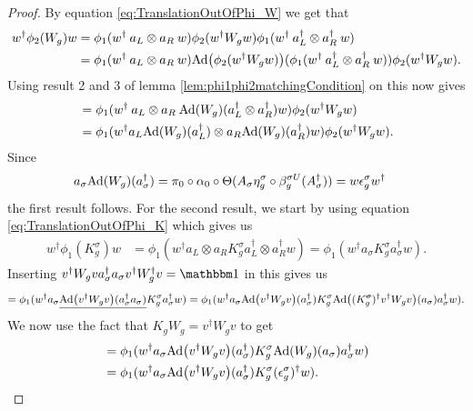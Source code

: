 \documentclass[11pt,a4paper,twoside]{article}
\numberwithin{equation}{section}
\begin{document}
	\begin{proof}
		By equation \eqref{eq:TranslationOutOfPhi_W} we get that
		\begin{align}
			w^\dagger\phi_2(W_g)w&=\phi_1(w^\dagger \: a_L\otimes a_R \: w)\phi_2(w^\dagger W_g w)\phi_1(w^\dagger \: a_L^\dagger\otimes a_R^\dagger \: w)\\
			&=\phi_1(w^\dagger \: a_L\otimes a_R \: w)\Ad{\phi_2(w^\dagger W_g w)}(\phi_1(w^\dagger \: a_L^\dagger\otimes a_R^\dagger \: w))\phi_2(w^\dagger W_g w).
		\end{align}
		Using result 2 and 3 of lemma \ref{lem:phi1phi2matchingCondition} on this now gives
		\begin{align}
			&=\phi_1(w^\dagger \: a_L\otimes a_R \:\Ad{W_g}(a_L^\dagger\otimes a_R^\dagger)w)\phi_2(w^\dagger W_g w)\\
			&=\phi_1(w^\dagger a_L\Ad{W_g}(a_L^\dagger)\otimes a_R \Ad{W_g}( a_R^\dagger)w)\phi_2(w^\dagger W_g w).
		\end{align}
		Since
		\begin{align}
			a_\sigma\Ad{W_g}(a_\sigma^\dagger)&=\pi_0\circ\alpha_0\circ\Theta(A_\sigma\eta_g^\sigma\circ\beta_g^{\sigma U}(A_\sigma^\dagger))=w\epsilon_g^\sigma w^\dagger
		\end{align}
		the first result follows. For the second result, we start by using equation \eqref{eq:TranslationOutOfPhi_K} which gives us
		\begin{align}
			w^\dagger \phi_1(K_g^\sigma)w&=\phi_1(w^\dagger a_L\otimes a_R K_g^\sigma a_L^\dagger\otimes a_R^\dagger w)=\phi_1(w^\dagger a_\sigma K_g^\sigma a_\sigma^\dagger w).
		\end{align}
		Inserting $v^\dagger W_g va_\sigma^\dagger a_\sigma v^\dagger W_g^\dagger v=\id$ in this gives us
		\begin{equation}
			=\phi_1(w^\dagger a_\sigma \underline{\Ad{v^\dagger W_g v}(a_\sigma^\dagger a_\sigma)} K_g^\sigma a_\sigma^\dagger w)=\phi_1(w^\dagger a_\sigma \Ad{v^\dagger W_g v}(a_\sigma^\dagger)K_g^\sigma  \Ad{(K_g^\stkout{\sigma})^\dagger v^\dagger W_g v}(a_\sigma) a_\sigma^\dagger w).
		\end{equation}
		We now use the fact that $K_g W_g=v^\dagger W_g v$ to get
		\begin{align}
			&=\phi_1(w^\dagger a_\sigma \Ad{v^\dagger W_g v}(a_\sigma^\dagger)K_g^\sigma  \Ad{W_g}(a_\sigma) a_\sigma^\dagger w)\\
			&=\phi_1(w^\dagger a_\sigma \Ad{v^\dagger W_g v}(a_\sigma^\dagger)K_g^\sigma  (\epsilon_g^\sigma)^\dagger w).
		\end{align}

\end{proof}
\end{document}
